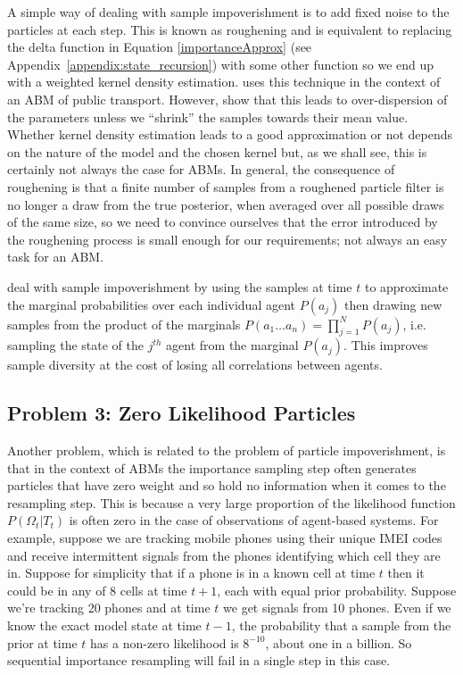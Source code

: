 \documentclass{article}
\begin{document}
A simple way of dealing with sample impoverishment is to add fixed noise to the particles at each step. This is known as roughening \citep*{gordon1993novel, li2014fight} and is equivalent to replacing the delta function in Equation \eqref{importanceApprox} (see Appendix~\ref{appendix:state_recursion}) with some other function so we end up with a weighted kernel density estimation. \citet{kieu_dealing_2020} uses this technique in the context of an ABM of public transport. However, \citet{liu2001combined} show that this leads to over-dispersion of the parameters unless we ``shrink'' the samples towards their mean value. Whether kernel density estimation leads to a good approximation or not depends on the nature of the model and the chosen kernel but, as we shall see, this is certainly not always the case for ABMs. In general, the consequence of roughening is that a finite number of samples from a roughened particle filter is no longer a draw from the true posterior, when averaged over all possible draws of the same size, so we need to convince ourselves that the error introduced by the roughening process is small enough for our requirements; not always an easy task for an ABM.

\citet{wang_data_2015} deal with sample impoverishment by using the samples at time $t$ to approximate the marginal probabilities over each individual agent $P(a_j)$ then drawing new samples from the product of the marginals $P(a_1 \dots a_n) = \prod_{j=1}^NP(a_j)$, i.e. sampling the state of the $j^{th}$ agent from the marginal $P(a_j)$. This improves sample diversity at the cost of losing all correlations between agents. 

\subsection{Problem 3: Zero Likelihood Particles}

Another problem, which is related to the problem of particle impoverishment, is that in the context of ABMs the importance sampling step often generates particles that have zero weight and so hold no information when it comes to the resampling step. This is because a very large proportion of the likelihood function $P(\Omega_t|T_t)$ is often zero in the case of observations of agent-based systems. For example, suppose we are tracking mobile phones using their unique IMEI codes and receive intermittent signals from the phones identifying which cell they are in. Suppose for simplicity that if a phone is in a known cell at time $t$ then it could be in any of 8 cells at time $t+1$, each with equal prior probability. Suppose we're tracking 20 phones and at time $t$ we get signals from 10 phones. Even if we know the exact model state at time $t-1$, the probability that a sample from the prior at time $t$ has a non-zero likelihood is $8^{-10}$, about one in a billion. So sequential importance resampling will fail in a single step in this case.
\end{document}
